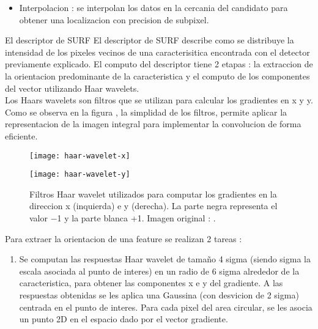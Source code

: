 \begin{subsection}
\begin{subsection}
\begin{itemize}
\item Interpolacion : se interpolan los datos en la cercania del candidato para obtener una localizacion con precision de subpixel.

\end{itemize}

\end{subsection}

\begin{subsection} 
{El descriptor de SURF}
El descriptor de SURF describe como se distribuye la intensidad de los pixeles vecinos de una caracterisitica encontrada con el detector previamente explicado. El computo del descriptor tiene 2 etapas : la extraccion de la orientacion predominante de la caracteristica y el computo de los componentes del vector utilizando Haar wavelets. \\ Los Haars wavelets son filtros que se utilizan para calcular los gradientes en x y y. Como se observa en la figura \cite{fig:haar-wavelet}, la simplidad de los filtros, permite aplicar la representacion de la imagen integral para implementar la convolucion de forma eficiente.

\begin{figure}[ht]
\centering
\begin{minipage}[h]{.45\textwidth}
\begin{center}
\texttt{[image: haar-wavelet-x]}
\end{center}
\end{minipage}
\hfill
\begin{minipage}[h]{.45\textwidth}
\begin{center}
\texttt{[image: haar-wavelet-y]}
\end{center}
\end{minipage}
\hfill
\caption[Haar wavelet]{Filtros Haar wavelet utilizados para computar los gradientes en la direccion x (inquierda) e y (derecha). La parte negra representa el valor −1 y la parte blanca +1. Imagen original : \cite{bay2008speeded}.}
\label{fig:haar-wavelet}
\end{figure}

Para extraer la orientacion de una feature se realizan 2 tareas : 

\begin{enumerate}

\item Se computan las respuestas Haar wavelet de tamaño 4 sigma (siendo sigma la escala asociada al punto de interes) en un radio de 6 sigma alrededor de la caracteristica, para obtener las componentes x e y del gradiente. A las respuestas obtenidas se les aplica una Gaussina (con desvicion de 2 sigma) centrada en el punto de interes. Para cada pixel del area circular, se les asocia un punto 2D en el espacio dado por el vector gradiente.


\end{enumerate}
\end{subsection}
\end{subsection}
